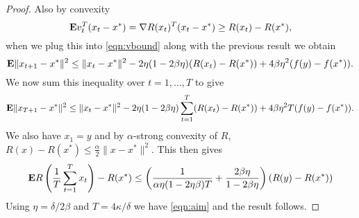 \begin{theorem}
\begin{proof}
Also by convexity
\begin{equation}
	\mathbf{E} v_t^T(x_t - x^*) = \nabla R(x_t)^T(x_t - x^*) \ge R(x_t) - R(x^*),
\end{equation}
when we plug this into \eqref{eqn:vbound} along with the previous result we obtain
\begin{equation}
	\mathbf{E} \|x_{t+1} - x^*\|^2 \le \|x_t-x^*\|^2 - 2\eta (1 - 2\beta \eta)(R(x_t) - R(x^*))+ 4\beta \eta^2 (f(y) - f(x^*)).
\end{equation}
We now sum this inequality over $t=1, ..., T$ to give
\begin{equation}
	\mathbf{E} \|x_{T+1} - x^*\|^2 \le \|x_t-x^*\|^2 - 2\eta (1 - 2\beta \eta) \sum_{t=1}^T(R(x_t) - R(x^*))+ 4\beta \eta^2 T(f(y) - f(x^*)).
\end{equation}
We also have $x_1= y$ and by $\alpha$-strong convexity of $R$, $R(x) - R(x^*) \le \frac{\alpha}{2}\|x - x^*\|^2$. This then gives
\begin{equation}
	\mathbf{E} R\left(\frac{1}{T}\sum_{t=1}^T x_t \right) - R(x^*) \le \left(\frac{1}{\alpha \eta (1 - 2\eta \beta)T} + \frac{2\beta \eta}{1 - 2\beta \eta} \right)(R(y) - R(x^*))
\end{equation}
Using $\eta = \delta/2\beta$ and $T = 4\kappa/\delta$ we have \eqref{eqn:aim} and the result follows.

\end{proof}

\end{theorem}
